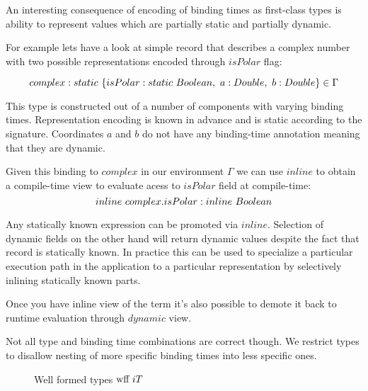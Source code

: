 An interesting consequence of encoding of binding times as first-class types is
ability to represent values which are partially static and partially dynamic.

For example lets have a look at simple record that describes a complex number with
two possible representations encoded through $isPolar$ flag:

\begin{equation}\nonumber
    complex: static\ \{ isPolar: static\ Boolean,\ a: Double,\ b: Double \} \in \Gamma
\end{equation}

This type is constructed out of a number of components with varying binding times.
Representation encoding is known in advance and is static according to the signature.
Coordinates $a$ and $b$ do not have any binding-time annotation meaning that they are
dynamic.

Given this binding to $complex$ in our environment $\Gamma$ we can use $inline$ to obtain
a compile-time view to evaluate acess to $isPolar$ field at compile-time:
\begin{equation}\nonumber
  inline\ complex.isPolar: inline\ Boolean
\end{equation}

Any statically known expression can be promoted via $inline$. Selection of dynamic fields
on the other hand will return dynamic values despite the fact that record is statically known.
In practice this can be used to specialize a particular execution path in the application to
a particular representation by selectively inlining statically known parts.

Once you have inline view of the term it's also possible to demote it back to runtime evaluation
through $dynamic$ view.

Not all type and binding time combinations are correct though. We restrict types
to disallow nesting of more specific binding times into less specific ones.

\begin{figure}
\begin{multicols}{2}

  {}

  {}

  {}
\end{multicols}
\caption {Well formed types $\text{wff}\ i T$}
\end{figure}


